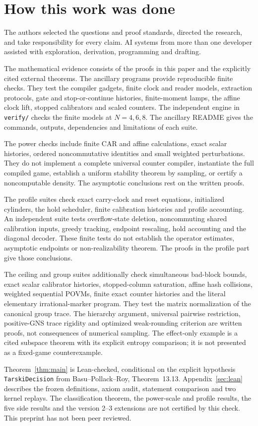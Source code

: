 \section*{How this work was done}\label{sec:methods}

The authors selected the questions and proof standards, directed the research, and take responsibility for every claim. AI systems from more than one developer assisted with exploration, derivation, programming and drafting.

The mathematical evidence consists of the proofs in this paper and the explicitly cited external theorems. The ancillary programs provide reproducible finite checks. They test the compiler gadgets, finite clock and reader models, extraction protocols, gate and stop-or-continue histories, finite-moment lamps, the affine clock lift, stopped calibrators and scaled counters. The independent engine in \texttt{verify/} checks the finite models at $N=4,6,8$. The ancillary README gives the commands, outputs, dependencies and limitations of each suite.

The power checks include finite CAR and affine calculations, exact scalar histories, ordered noncommutative identities and small weighted perturbations. They do not implement a complete universal counter compiler, instantiate the full compiled game, establish a uniform stability theorem by sampling, or certify a noncomputable density. The asymptotic conclusions rest on the written proofs.

The profile suites check exact carry-clock and reset equations, initialized cylinders, the hold scheduler, finite calibration histories and profile accounting. An independent suite tests overflow-state deletion, noncommuting shared calibration inputs, greedy tracking, endpoint rescaling, hold accounting and the diagonal decoder. These finite tests do not establish the operator estimates, asymptotic endpoints or non-realizability theorem. The proofs in the profile part give those conclusions.

The ceiling and group suites additionally check simultaneous bad-block bounds, exact scalar calibrator histories, stopped-column saturation, affine hash collisions, weighted sequential POVMs, finite exact counter histories and the literal elementary irrational-marker program. They test the matrix normalization of the canonical group trace. The hierarchy argument, universal pairwise restriction, positive-GNS trace rigidity and optimized weak-rounding criterion are written proofs, not consequences of numerical sampling. The effect-only example is a cited subspace theorem with its explicit entropy comparison; it is not presented as a fixed-game counterexample.

Theorem~\ref{thm:main} is Lean-checked, conditional on the explicit hypothesis \texttt{TarskiDecision} from Basu--Pollack--Roy, Theorem~13.13. Appendix~\ref{sec:lean} describes the frozen definitions, axiom audit, statement comparison and two kernel replays. The classification theorem, the power-scale and profile results, the five side results and the version 2--3 extensions are not certified by this check. This preprint has not been peer reviewed.
